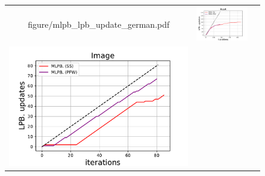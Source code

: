 \begin{figure}[p]
\begin{tabular}{ccc}
\begin{minipage}[t]{0.31\hsize}
            {figure/mlpb_lpb_update_german.pdf}
        \end{minipage}
        &
        \begin{minipage}[t]{0.31\hsize}
            \centering
            \includegraphics[keepaspectratio, scale=0.30]
            {figure/mlpb_lpb_update_heart.pdf}
        \end{minipage}
        \\
        \begin{minipage}[t]{0.31\hsize}
            \centering
            \includegraphics[keepaspectratio, scale=0.30]
            {figure/mlpb_lpb_update_image.pdf}
        \end{minipage}
        &
        \begin{minipage}[t]{0.31\hsize}
            \centering

\end{minipage}
\end{tabular}
\end{figure}
